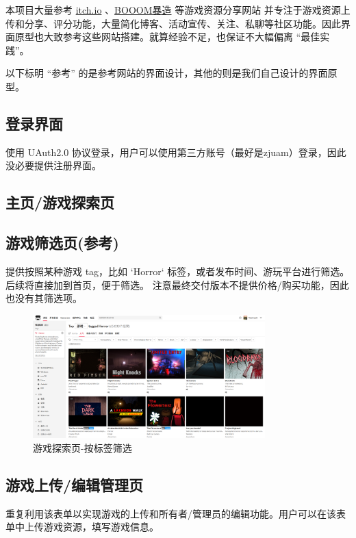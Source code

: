 \documentclass[12pt]{ctexart} %
\begin{document}
本项目大量参考 \href{https://itch.io}{itch.io} 、\href{https://www.gcores.com/booom/game_lib}{BOOOM暴造} 等游戏资源分享网站
并专注于游戏资源上传和分享、评分功能，大量简化博客、活动宣传、关注、私聊等社区功能。因此界面原型也大致参考这些网站搭建。就算经验不足，也保证不大幅偏离 “最佳实践”。

以下标明 “参考” 的是参考网站的界面设计，其他的则是我们自己设计的界面原型。

\subsection{登录界面}

使用 UAuth2.0 协议登录，用户可以使用第三方账号（最好是zjuam）登录，因此没必要提供注册界面。

\subsection{主页/游戏探索页}


\subsection{游戏筛选页(参考)}

提供按照某种游戏 tag，比如 `Horror` 标签，或者发布时间、游玩平台进行筛选。后续将直接加到首页，便于筛选。
注意最终交付版本不提供价格/购买功能，因此也没有其筛选项。

\begin{figure}[H]
  \centering
  \includegraphics[width=0.8\textwidth]{UI-tagged.png}
  \caption{游戏探索页-按标签筛选}
\end{figure}

\subsection{游戏上传/编辑管理页}

重复利用该表单以实现游戏的上传和所有者/管理员的编辑功能。用户可以在该表单中上传游戏资源，填写游戏信息。
\end{document}
